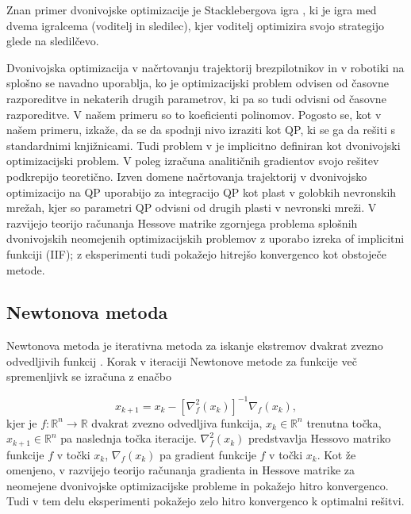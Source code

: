 \documentclass[mat2, tisk]{fmfdelo}
\begin{document}
Znan primer dvonivojske optimizacije je Stacklebergova igra \cite{stackelberg1934marktform}, ki je igra med dvema igralcema (voditelj in sledilec), kjer voditelj optimizira svojo strategijo glede na sledilčevo. 

Dvonivojska optimizacija v načrtovanju trajektorij brezpilotnikov in v robotiki na splošno se navadno uporablja, ko je optimizacijski problem odvisen od časovne razporeditve in nekaterih drugih parametrov, ki pa so tudi odvisni od časovne razporeditve. V našem primeru so to koeficienti polinomov. Pogosto se, kot v našem primeru, izkaže, da se da spodnji nivo izraziti kot QP, ki se ga da rešiti s standardnimi knjižnicami. Tudi problem v \cite{mellinger2011minimum} je implicitno definiran kot dvonivojski optimizacijski problem. V \cite{sun2021fast} poleg izračuna analitičnih gradientov svojo rešitev podkrepijo teoretično. Izven domene načrtovanja trajektorij v \cite{amos2017optnet} dvonivojsko optimizacijo na QP uporabijo za integracijo QP kot plast v golobkih nevronskih mrežah, kjer so parametri QP odvisni od drugih plasti v nevronski mreži. V \cite{dyro2022second} razvijejo teorijo računanja Hessove matrike zgornjega problema splošnih dvonivojskih neomejenih optimizacijskih problemov z uporabo izreka of implicitni funkciji (IIF); z eksperimenti tudi pokažejo hitrejšo konvergenco kot obstoječe metode.

\subsection{Newtonova metoda}
Newtonova metoda je iterativna metoda za iskanje ekstremov dvakrat zvezno odvedljivih funkcij \cite{newton1736method, boyd2004convex}. Korak v iteraciji Newtonove metode za funkcije več spremenljivk se izračuna z enačbo

\begin{equation}
    x_{k+1} = x_k - [\nabla^2_f(x_k)]^{-1} \nabla_f(x_k), 
\end{equation}
kjer je $f : \mathbb{R}^n \to \mathbb{R}$ dvakrat zvezno odvedljiva funkcija, $x_k \in \mathbb{R}^n$ trenutna točka, $x_{k+1} \in \mathbb{R}^n$ pa naslednja točka iteracije. $\nabla^2_f(x_k)$ predstvavlja Hessovo matriko funkcije $f$ v točki $x_k$, $\nabla_f(x_k)$ pa gradient funkcije $f$ v točki $x_k$. Kot že omenjeno, v \cite{dyro2022second} razvijejo teorijo računanja gradienta in Hessove matrike za neomejene dvonivojske optimizacijske probleme in pokažejo hitro konvergenco. Tudi v tem delu eksperimenti pokažejo zelo hitro konvergenco k optimalni rešitvi.
\end{document}

